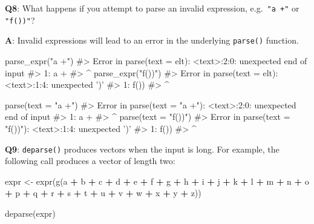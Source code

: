 \documentclass[
]{krantz}
\makeatletter
\newenvironment{Shaded}{\begin{snugshade}}{\end{snugshade}}
\newcommand{\CommentTok}[1]{\textcolor[rgb]{0.56,0.35,0.01}{\textit{#1}}}
\newcommand{\DataTypeTok}[1]{\textcolor[rgb]{0.13,0.29,0.53}{#1}}
\newcommand{\KeywordTok}[1]{\textcolor[rgb]{0.13,0.29,0.53}{\textbf{#1}}}
\newcommand{\NormalTok}[1]{#1}
\newcommand{\OperatorTok}[1]{\textcolor[rgb]{0.81,0.36,0.00}{\textbf{#1}}}
\newcommand{\StringTok}[1]{\textcolor[rgb]{0.31,0.60,0.02}{#1}}
\newenvironment{kframe}{%
\medskip{}
\setlength{\fboxsep}{.8em}
 \def\at@end@of@kframe{}%
 \ifinner\ifhmode%
  \def\at@end@of@kframe{\end{minipage}}%
  \begin{minipage}{\columnwidth}%
 \fi\fi%
 \def\FrameCommand##1{\hskip\@totalleftmargin \hskip-\fboxsep
 \colorbox{shadecolor}{##1}\hskip-\fboxsep
     \hskip-\linewidth \hskip-\@totalleftmargin \hskip\columnwidth}%
 \MakeFramed {\advance\hsize-\width
   \@totalleftmargin\z@ \linewidth\hsize
   \@setminipage}}%
 {\par\unskip\endMakeFramed%
 \at@end@of@kframe}
\renewenvironment{Shaded}{\begin{kframe}}{\end{kframe}}
\renewcommand{\KeywordTok} [1]{\textcolor[rgb]{0.00,0.44,0.13}{{#1}}}
\renewcommand{\DataTypeTok}[1]{\textcolor[rgb]{0.56,0.13,0.00}{{#1}}}
\renewcommand{\StringTok}  [1]{\textcolor[rgb]{0.25,0.44,0.63}{{#1}}}
\renewcommand{\CommentTok} [1]{\textcolor[rgb]{0.38,0.63,0.69}{{#1}}}
\renewcommand{\NormalTok}  [1]{{#1}}
\makeatother
\begin{document}
\textbf{{Q8}}: What happens if you attempt to parse an invalid expression, e.g.~\texttt{"a\ +"} or \texttt{"f())"}?

\textbf{{A}}: Invalid expressions will lead to an error in the underlying \texttt{parse()} function.

\begin{Shaded}
\begin{Highlighting}[]
\KeywordTok{parse_expr}\NormalTok{(}\StringTok{"a +"}\NormalTok{)}
\CommentTok{#> Error in parse(text = elt): <text>:2:0: unexpected end of input}
\CommentTok{#> 1: a +}
\CommentTok{#> ^}
\KeywordTok{parse_expr}\NormalTok{(}\StringTok{"f())"}\NormalTok{)}
\CommentTok{#> Error in parse(text = elt): <text>:1:4: unexpected ')'}
\CommentTok{#> 1: f())}
\CommentTok{#> ^}

\KeywordTok{parse}\NormalTok{(}\DataTypeTok{text =} \StringTok{"a +"}\NormalTok{)}
\CommentTok{#> Error in parse(text = "a +"): <text>:2:0: unexpected end of input}
\CommentTok{#> 1: a +}
\CommentTok{#> ^}
\KeywordTok{parse}\NormalTok{(}\DataTypeTok{text =} \StringTok{"f())"}\NormalTok{)}
\CommentTok{#> Error in parse(text = "f())"): <text>:1:4: unexpected ')'}
\CommentTok{#> 1: f())}
\CommentTok{#> ^}
\end{Highlighting}
\end{Shaded}

\textbf{{Q9}}: \texttt{deparse()} produces vectors when the input is long. For example, the following call produces a vector of length two:

\begin{Shaded}
\begin{Highlighting}[]
\NormalTok{expr <-}\StringTok{ }\KeywordTok{expr}\NormalTok{(}\KeywordTok{g}\NormalTok{(a }\OperatorTok{+}\StringTok{ }\NormalTok{b }\OperatorTok{+}\StringTok{ }\NormalTok{c }\OperatorTok{+}\StringTok{ }\NormalTok{d }\OperatorTok{+}\StringTok{ }\NormalTok{e }\OperatorTok{+}\StringTok{ }\NormalTok{f }\OperatorTok{+}\StringTok{ }\NormalTok{g }\OperatorTok{+}\StringTok{ }\NormalTok{h }\OperatorTok{+}\StringTok{ }\NormalTok{i }\OperatorTok{+}\StringTok{ }\NormalTok{j }\OperatorTok{+}\StringTok{ }\NormalTok{k }\OperatorTok{+}\StringTok{ }\NormalTok{l }\OperatorTok{+}\StringTok{ }\NormalTok{m }\OperatorTok{+}\StringTok{ }
\StringTok{                 }\NormalTok{n }\OperatorTok{+}\StringTok{ }\NormalTok{o }\OperatorTok{+}\StringTok{ }\NormalTok{p }\OperatorTok{+}\StringTok{ }\NormalTok{q }\OperatorTok{+}\StringTok{ }\NormalTok{r }\OperatorTok{+}\StringTok{ }\NormalTok{s }\OperatorTok{+}\StringTok{ }\NormalTok{t }\OperatorTok{+}\StringTok{ }\NormalTok{u }\OperatorTok{+}\StringTok{ }\NormalTok{v }\OperatorTok{+}\StringTok{ }\NormalTok{w }\OperatorTok{+}\StringTok{ }\NormalTok{x }\OperatorTok{+}\StringTok{ }\NormalTok{y }\OperatorTok{+}\StringTok{ }\NormalTok{z))}

\KeywordTok{deparse}\NormalTok{(expr)}
\end{Highlighting}
\end{Shaded}
\end{document}
